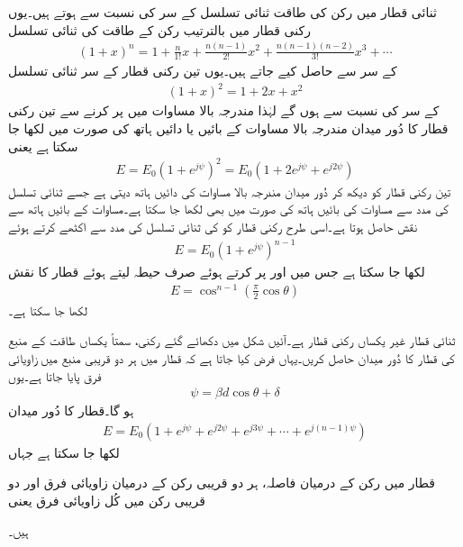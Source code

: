 ثنائی قطار میں رکن کی طاقت ثنائی تسلسل کے سر کی نسبت سے ہوتے ہیں۔یوں  رکنی قطار میں بالترتیب رکن کے طاقت  کی ثنائی تسلسل
\begin{align}
(1+x)^n =1+\frac{n}{1!}x+\frac{n(n-1)}{2!}x^2+\frac{n(n-1)(n-2)}{3!}x^3+\cdots
\end{align}
  کے سر سے حاصل کیے جاتے ہیں۔یوں تین رکنی قطار کے سر ثنائی تسلسل
\begin{align}
(1+x)^2=1+2x+x^2
\end{align} 
کے سر کی نسبت  سے  ہوں گے لہٰذا مندرجہ بالا مساوات میں  پر کرنے سے تین رکنی قطار کا دُور میدان مندرجہ بالا مساوات کے بائیں یا دائیں ہاتھ کی صورت میں لکھا جا سکتا ہے یعنی 
\begin{align}
E=E_0\left(1+e^{j\psi} \right)^2 =E_0 (1+2e^{j\psi} +e^{j 2\psi})
\end{align}
تین رکنی قطار کو دیکھ کر دُور میدان مندرجہ بالا مساوات کی دائیں ہاتھ دیتی ہے جسے ثنائی تسلسل کی مدد سے مساوات کی بائیں ہاتھ کی صورت میں بھی لکھا جا سکتا ہے۔مساوات کے بائیں ہاتھ سے نقش  حاصل ہوتا ہے۔اسی طرح  رکنی قطار کو  کی ثنائی تسلسل کی مدد سے اکٹھے کرتے ہوئے
\begin{align}
E=E_0 \left(1+e^{j\psi} \right)^{n-1}
\end{align}
لکھا جا سکتا ہے جس میں  اور  پر کرتے ہوئے صرف حیطہ لیتے ہوئے قطار کا نقش
\begin{align}
E=\cos^{n-1} \left(\frac{\pi}{2} \cos \theta\right)
\end{align}
لکھا جا سکتا ہے۔

ثنائی قطار غیر یکساں رکنی قطار ہے۔آئیں شکل  میں دکھائے گئے  رکنی، سمتاً یکساں   طاقت کے منبع کی قطار کا دُور میدان حاصل کریں۔یہاں فرض کیا جاتا ہے کہ قطار میں ہر دو قریبی منبع میں  زاویائی فرق پایا جاتا ہے۔یوں
\begin{align}
\psi=\beta d \cos \theta +\delta
\end{align}
ہو گا۔قطار  کا دُور میدان
\begin{align}\label{مساوات_اینٹینا_یکساں_قطار_الف}
E=E_0\left(1+e^{j \psi}+e^{j 2 \psi}+e^{j 3 \psi} +\cdots +e^{j(n-1)\psi} \right)
\end{align}
لکھا جا سکتا ہے جہاں
\begin{description}
 قطار میں رکن کے درمیان فاصلہ،
 ہر دو قریبی رکن کے درمیان زاویائی فرق اور
 دو قریبی رکن میں کُل زاویائی فرق یعنی 
\end{description}
ہیں۔

